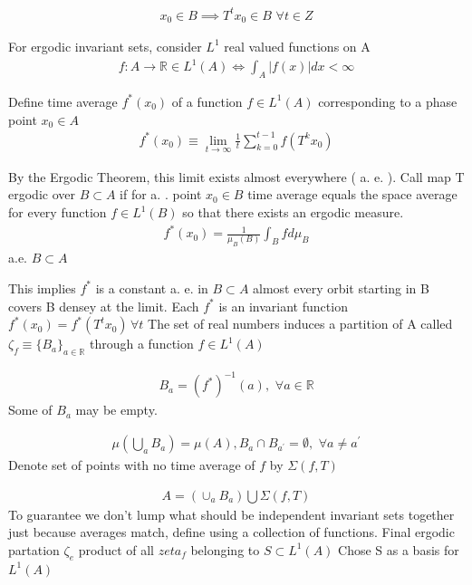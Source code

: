 \documentclass[12pt]{article}
\begin{document}
\begin{gather*}
  x_0 \in B \implies T^t x_0 \in B \,\,\forall t \in Z
\end{gather*}

For ergodic invariant sets, consider $L^1$ real valued functions on A
\begin{gather*}
 f:A \rightarrow \mathbb{R}\in L^1(A) \iff \int_A |f(x)|dx <\infty
\end{gather*}

Define time average $f^\ast(x_0)$ of a function $f\in L^1(A)$ corresponding to a phase point $x_0\in A$
\begin{gather*}
  f^\ast(x_0)\equiv \lim_{t\rightarrow\infty} \frac{1}{t}\sum_{k=0}^{t-1}f(T^kx_0)
\end{gather*}

By the Ergodic Theorem, this limit exists almost everywhere ( a. e. ).
Call map T ergodic over $B \subset A$ if for a. . point  $x_0 \in B$ time average equals the space average for every function $f \in L^1(B)$ so that there exists an
ergodic measure.
\begin{gather*}
f^\ast(x_0) =\frac{1}{\mu_B(B)}\int_B f d\mu_B  
\end{gather*}
a.e. $B \subset A$

This implies $f^\ast$ is a constant a. e. in $B \subset A$  almost every orbit starting in B covers B densey at the limit.  Each $f^\ast$ is an invariant function $f^\ast(x_0)= f^\ast(T^tx_0) \, \forall t$  
The set of real numbers induces a partition of A called $\zeta_f\equiv \{B_a\}_{a\in\mathbb{R}}$ through a function $f\in L^1(A)$

\begin{gather*}
  B_a=(f^\ast)^{-1}(a), \,\,\forall a \in \mathbb{R}
\end{gather*}
Some of $B_a$ may be empty.

\begin{gather*}
  \mu\left (\bigcup_aB_a \right )=\mu(A),B_a\cap B_{a^\prime} = \emptyset ,\,\,\forall a \ne a^\prime
\end{gather*}
Denote set of points with no time average of $f$ by $\Sigma(f,T)$

\begin{gather*}
  A=(\cup_aB_a)\bigcup \Sigma(f,T)
\end{gather*}
To guarantee we don't lump what should be independent invariant sets together just because averages match, define using a collection of functions.
Final ergodic partation $\zeta_e$ product of all $zeta_f$ belonging to $S \subset L^1(A)$  Chose S as a basis for $L^1(A)$
\end{document}
